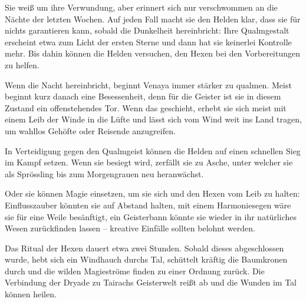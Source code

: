 Sie weiß um ihre Verwundung, aber erinnert sich nur verschwommen an die Nächte der letzten Wochen.
Auf jeden Fall macht sie den Helden klar, dass sie für nichts garantieren kann, sobald die Dunkelheit hereinbricht:
Ihre Qualmgestalt erscheint etwa zum Licht der ersten Sterne und dann hat sie keinerlei Kontrolle mehr.
Bis dahin können die Helden versuchen, den Hexen bei den Vorbereitungen zu helfen.


Wenn die Nacht hereinbricht, beginnt Venaya immer stärker zu qualmen.
Meist beginnt kurz danach eine Besessenheit, denn für die Geister ist sie in diesem Zustand ein offenstehendes Tor.
Wenn das geschieht, erhebt sie sich meist mit einem Leib der Winde in die Lüfte und lässt sich vom Wind weit ins Land tragen, um wahllos Gehöfte oder Reisende anzugreifen.


In Verteidigung gegen den Qualmgeist können die Helden auf einen schnellen Sieg im Kampf setzen.
Wenn sie besiegt wird, zerfällt sie zu Asche, unter welcher sie als Sprössling bis zum Morgengrauen neu heranwächst.

Oder sie können Magie einsetzen, um sie sich und den Hexen vom Leib zu halten:
Einflusszauber könnten sie auf Abstand halten, mit einem Harmoniesegen wäre sie für eine Weile besänftigt, ein Geisterbann könnte sie wieder in ihr natürliches Wesen zurückfinden lassen -- kreative Einfälle sollten belohnt werden.

Das Ritual der Hexen dauert etwa zwei Stunden. Sobald dieses abgeschlossen wurde, hebt sich ein Windhauch durchs Tal, schüttelt kräftig die Baumkronen durch und die wilden Magieströme finden zu einer Ordnung zurück.
Die Verbindung der Dryade zu Tairachs Geisterwelt reißt ab und die Wunden im Tal können heilen.



